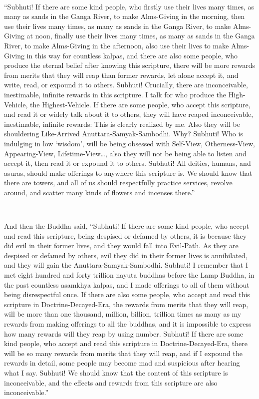 \documentclass[a5paper,12pt]{book}
\begin{document}
    ~

     ``Subhuti! If there are some kind people, who firstly use their lives many times, as many as sands in the Ganga River, to make Alms-Giving in the morning, then use their lives many times, as many as sands in the Ganga River, to make Alms-Giving at noon, finally use their lives many times, as many as sands in the Ganga River, to make Alms-Giving in the afternoon, also use their lives to make Alms-Giving in this way for countless kalpas, and there are also some people, who produce the eternal belief after knowing this scripture, there will be more rewards from merits that they will reap than former rewards, let alone accept it, and write, read, or expound it to others. Subhuti! Crucially, there are inconceivable, inestimable, infinite rewards in this scripture. I talk for who produce the High-Vehicle, the Highest-Vehicle. If there are some people, who accept this scripture, and read it or widely talk about it to others, they will have reaped inconceivable, inestimable, infinite rewards: This is clearly realized by me. Also they will be shouldering Like-Arrived Anuttara-Samyak-Sambodhi. Why? Subhuti! Who is indulging in low `wisdom', will be being obsessed with Self-View, Otherness-View, Appearing-View, Lifetime-View\dots{}, also they will not be being able to listen and accept it, then read it or expound it to others. Subhuti! All deities, humans, and asuras, should make offerings to anywhere this scripture is. We should know that there are towers, and all of us should respectfully practice services, revolve around, and scatter many kinds of flowers and incenses there.''

    ~

     And then the Buddha said, ``Subhuti! If there are some kind people, who accept and read this scripture, being despised or defamed by others, it is because they did evil in their former lives, and they would fall into Evil-Path. As they are despised or defamed by others, evil they did in their former lives is annihilated, and they will gain the Anuttara-Samyak-Sambodhi. Subhuti! I remember that I met eight hundred and forty trillion nayuta buddhas before the Lamp Buddha, in the past countless asamkhya kalpas, and I made offerings to all of them without being disrespectful once. If there are also some people, who accept and read this scripture in Doctrine-Decayed-Era, the rewards from merits that they will reap, will be more than one thousand, million, billion, trillion times as many as my rewards from making offerings to all the buddhas, and it is impossible to express how many rewards will they reap by using number. Subhuti! If there are some kind people, who accept and read this scripture in Doctrine-Decayed-Era, there will be so many rewards from merits that they will reap, and if I expound the rewards in detail, some people may become mad and suspicious after hearing what I say. Subhuti! We should know that the content of this scripture is inconceivable, and the effects and rewards from this scripture are also inconceivable.''
\end{document}

